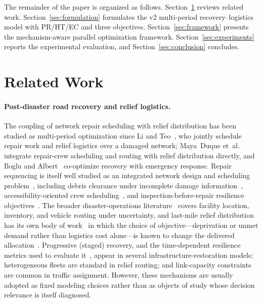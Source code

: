 \documentclass[10pt,conference,letterpaper]{IEEEtran}
\begin{document}
The remainder of the paper is organized as follows.
Section~\ref{sec:related} reviews related work.
Section~\ref{sec:formulation} formulates the v2 multi-period
recovery--logistics model with PR/HT/EC and three objectives.
Section~\ref{sec:framework} presents the mechanism-aware parallel
optimization framework.
Section~\ref{sec:experiments} reports the experimental evaluation, and
Section~\ref{sec:conclusion} concludes.

\section{Related Work}
\label{sec:related}

\paragraph{Post-disaster road recovery and relief logistics.}
The coupling of network repair scheduling with relief distribution has been
studied as multi-period optimization since Li and Teo~\cite{li2019post},
who jointly schedule repair work and relief logistics over a damaged
network; Maya~Duque et~al.~\cite{mayaduque2016network} integrate repair-crew
scheduling and routing with relief distribution directly, and Iloglu and
Albert~\cite{iloglu2018integrated} co-optimize recovery with emergency
response. Repair sequencing is itself well studied as an integrated
network design and scheduling problem~\cite{nurre2012restoring,
cavdaroglu2013integrating}, including debris clearance under incomplete
damage information~\cite{celik2015postdisaster},
accessibility-oriented crew scheduling~\cite{mayaduque2011grasp}, and
inspection-before-repair resilience objectives~\cite{zhang2022dynamic}.
The broader disaster-operations literature~\cite{altay2006or,
caunhye2012optimization,vanwassenhove2006humanitarian} covers facility
location, inventory, and vehicle routing under uncertainty, and last-mile
relief distribution has its own body of work~\cite{balcik2008lastmile} in
which the choice of objective---deprivation or unmet demand rather than
logistics cost alone---is known to change the delivered
allocation~\cite{holguinveras2013appropriate,huang2012models}.
Progressive (staged) recovery, and the time-dependent resilience metrics
used to evaluate it~\cite{ouyang2012timedependent,henry2012generic,
hosseini2016review}, appear in several infrastructure-restoration models;
heterogeneous fleets are standard in relief routing; and link-capacity
constraints are common in traffic assignment. However, these mechanisms
are usually adopted as fixed modeling choices rather than as objects of
study whose decision relevance is itself diagnosed.
\end{document}
